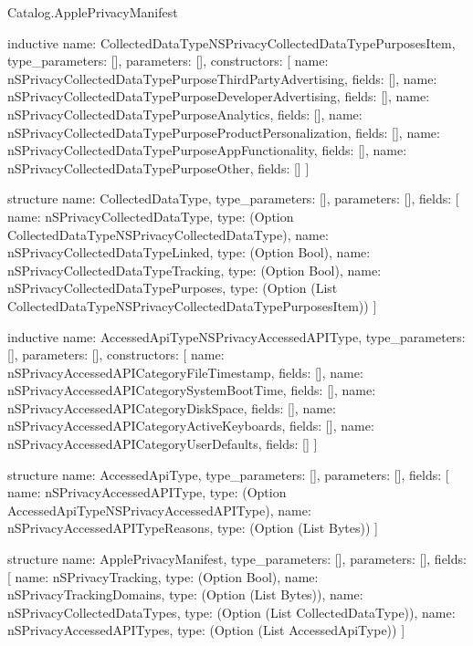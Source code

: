 \begin{lexlean}{Catalog.ApplePrivacyManifest}
\begin{semanticmodule}
inductive{
  name: CollectedDataTypeNSPrivacyCollectedDataTypePurposesItem,
  type_parameters: [],
  parameters: [],
  constructors: [
    {name: nSPrivacyCollectedDataTypePurposeThirdPartyAdvertising, fields: []},
    {name: nSPrivacyCollectedDataTypePurposeDeveloperAdvertising, fields: []},
    {name: nSPrivacyCollectedDataTypePurposeAnalytics, fields: []},
    {name: nSPrivacyCollectedDataTypePurposeProductPersonalization, fields: []},
    {name: nSPrivacyCollectedDataTypePurposeAppFunctionality, fields: []},
    {name: nSPrivacyCollectedDataTypePurposeOther, fields: []}
  ]
}

structure{
  name: CollectedDataType,
  type_parameters: [],
  parameters: [],
  fields: [
    {name: nSPrivacyCollectedDataType, type: (Option CollectedDataTypeNSPrivacyCollectedDataType)},
    {name: nSPrivacyCollectedDataTypeLinked, type: (Option Bool)},
    {name: nSPrivacyCollectedDataTypeTracking, type: (Option Bool)},
    {name: nSPrivacyCollectedDataTypePurposes, type: (Option (List CollectedDataTypeNSPrivacyCollectedDataTypePurposesItem))}
  ]
}

inductive{
  name: AccessedApiTypeNSPrivacyAccessedAPIType,
  type_parameters: [],
  parameters: [],
  constructors: [
    {name: nSPrivacyAccessedAPICategoryFileTimestamp, fields: []},
    {name: nSPrivacyAccessedAPICategorySystemBootTime, fields: []},
    {name: nSPrivacyAccessedAPICategoryDiskSpace, fields: []},
    {name: nSPrivacyAccessedAPICategoryActiveKeyboards, fields: []},
    {name: nSPrivacyAccessedAPICategoryUserDefaults, fields: []}
  ]
}

structure{
  name: AccessedApiType,
  type_parameters: [],
  parameters: [],
  fields: [
    {name: nSPrivacyAccessedAPIType, type: (Option AccessedApiTypeNSPrivacyAccessedAPIType)},
    {name: nSPrivacyAccessedAPITypeReasons, type: (Option (List Bytes))}
  ]
}

structure{
  name: ApplePrivacyManifest,
  type_parameters: [],
  parameters: [],
  fields: [
    {name: nSPrivacyTracking, type: (Option Bool)},
    {name: nSPrivacyTrackingDomains, type: (Option (List Bytes))},
    {name: nSPrivacyCollectedDataTypes, type: (Option (List CollectedDataType))},
    {name: nSPrivacyAccessedAPITypes, type: (Option (List AccessedApiType))}
  ]
}
\end{semanticmodule}
\end{lexlean}
